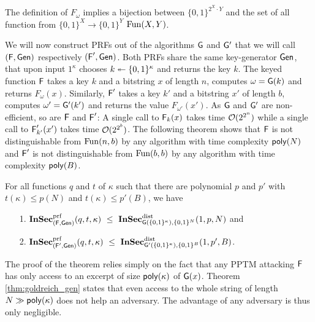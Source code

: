 The definition of $F_\omega$ implies a bijection between
$\{0,1\}^{2^{X}\cdot Y}$ and the set of all function from
$\{0,1\}^{X}\to \{0,1\}^{Y}$ \ie $\operatorname{Fun}(X,Y)$.

We will now construct \acp{PRF} out of the algorithms $\mathsf{G}$ and
$\mathsf{G'}$ that we will call $(\operatorname{\mathsf{F}},\operatorname{\mathsf{Gen}})$ respectively
$(\operatorname{\mathsf{F}}',\operatorname{\mathsf{Gen}})$.  Both \acp{PRF} share the same key-generator $\operatorname{\mathsf{Gen}}$,
that upon input $1^{\kappa}$ chooses $k\twoheadleftarrow \{0,1\}^{\kappa}$ and
returns the key $k$. The keyed function $\operatorname{\mathsf{F}}$ takes a key $k$ and a
bitstring $x$ of length $n$, computes $\omega = \mathsf{G}(k)$ and returns
$F_{\omega}(x)$. Similarly, $\operatorname{\mathsf{F}}'$ takes a key $k'$ and a bitstring
$x'$ of length $b$, computes $\omega'=\mathsf{G'}(k')$ and returns the
value $F_{\omega'}(x')$. As $\mathsf{G}$ and $\mathsf{G'}$ are
non-efficient, so are $\operatorname{\mathsf{F}}$ and $\operatorname{\mathsf{F}}'$: A single call to
$\operatorname{\mathsf{F}}_{k}(x)$ takes time $\mathcal{O}(2^{2^{n}})$ while a single call to
$\operatorname{\mathsf{F}}'_{k'}(x')$ takes time $\mathcal{O}(2^{2^{b}})$. The following
theorem shows that $\operatorname{\mathsf{F}}$ is not distinguishable from $\operatorname{Fun}(n,b)$ by
any algorithm with time complexity $\operatorname{\mathsf{poly}}(N)$ and $\operatorname{\mathsf{F}}'$ is not
distinguishable from $\operatorname{Fun}(b,b)$ by any algorithm with time complexity
$\operatorname{\mathsf{poly}}(B)$.

\begin{theorem}
\label{thm:dist_prf_exist}
For all functions $q$ and $t$ of $\kappa$ such that there are
polynomial $p$ and $p'$ with $t(\kappa)\leq p(N)$ and $t(\kappa)\leq p'(B)$, we have
\begin{enumerate}
 \item[1.]     
  $\operatorname{\mathbf{InSec}}^{\operatorname{prf}}_{(\operatorname{\mathsf{F}},\operatorname{\mathsf{Gen}})}(q,t,\kappa)\ \leq \
  \operatorname{\mathbf{InSec}}^{\operatorname{dist}}_{\mathsf{G}(\{0,1\}^{\kappa}),\{0,1\}^{N}}(1,p,N)$ and
  \item[2.]       
  $\operatorname{\mathbf{InSec}}^{\operatorname{prf}}_{(\operatorname{\mathsf{F}}',\operatorname{\mathsf{Gen}})}(q,t,\kappa)\ \leq \
  \operatorname{\mathbf{InSec}}^{\operatorname{dist}}_{\mathsf{G'}(\{0,1\}^{\kappa}),\{0,1\}^{B}}(1,p',B)$.
\end{enumerate}
\end{theorem}
The proof of the theorem relies simply on the fact that any
\ac{PPTM} attacking $\operatorname{\mathsf{F}}$ has only access to an excerpt of
size $\operatorname{\mathsf{poly}}(\kappa)$ of $\mathsf{G}(x)$. Theorem \ref{thm:goldreich_gen} states that even
access to the whole string of length $N\gg \operatorname{\mathsf{poly}}(\kappa)$ does not help
an adversary. The advantage of any adversary is thus only negligible. 

